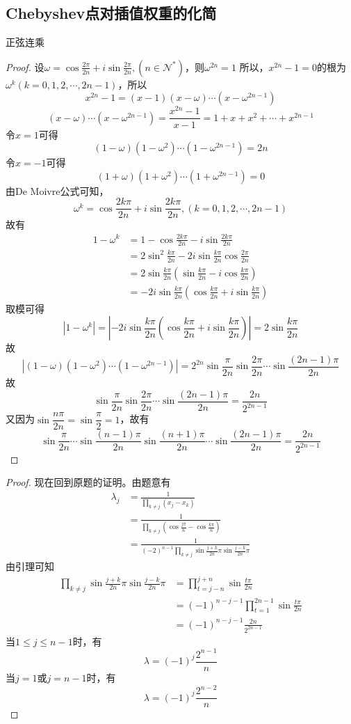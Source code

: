 \documentclass[]{report}
\begin{document}
		\subsection{Chebyshev点对插值权重的化简}
		\begin{lemma}正弦连乘
			\begin{proof}
				设$\displaystyle\omega=\cos\frac{2\pi}{2n}+i\sin\frac{2\pi}{2n},(n\in\mathcal{N}^*)$，则$\omega^{2n}=1$\newline
				所以，$x^{2n}-1=0$的根为$\omega^k(k=0,1,2,\cdots,2n-1)$，所以
				\[x^{2n}-1=(x-1)(x-\omega)\cdots(x-\omega^{2n-1})\]
				\[(x-\omega)\cdots(x-\omega^{2n-1})=\frac{x^{2n}-1}{x-1}=1+x+x^2+\cdots+x^{2n-1}\]
				令$x=1$可得
				\[(1-\omega)(1-\omega^2)\cdots(1-\omega^{2n-1})=2n\]
				令$x=-1$可得
				\[(1+\omega)(1+\omega^2)\cdots(1+\omega^{2n-1})=0\]
				由De Moivre公式可知，
				\[\omega^k=\cos\frac{2k\pi}{2n}+i\sin\frac{2k\pi}{2n},(k=0,1,2,\cdots,2n-1)\]
				故有
				\[\begin{aligned}
					1-\omega^k
					&=1-\cos\frac{2k\pi}{2n}-i\sin\frac{2k\pi}{2n}\\
					&=2\sin^2\frac{k\pi}{2n}-2i\sin\frac{k\pi}{2n}\cos\frac{2\pi}{2n}\\
					&=2\sin\frac{k\pi}{2n}(\sin\frac{k\pi}{2n}-i\cos\frac{k\pi}{2n})\\
					&=-2i\sin\frac{k\pi}{2n}(\cos\frac{k\pi}{2n}+i\sin\frac{k\pi}{2n})
				\end{aligned}\]
				取模可得
				\[|1-\omega^k|=|-2i\sin\frac{k\pi}{2n}(\cos\frac{k\pi}{2n}+i\sin\frac{k\pi}{2n})|=2\sin\frac{k\pi}{2n}\]
				故
				\[|(1-\omega)(1-\omega^2)\cdots(1-\omega^{2n-1})|=2^{2n}\sin\frac{\pi}{2n}\sin\frac{2\pi}{2n}\cdots\sin\frac{(2n-1)\pi}{2n}\]
				故
				\[\sin\frac{\pi}{2n}\sin\frac{2\pi}{2n}\cdots\sin\frac{(2n-1)\pi}{2n}=\frac{2n}{2^{2n-1}}\]
				又因为$\sin\dfrac{n\pi}{2n}=\sin\dfrac{\pi}{2}=1$，故有
				\[\sin\frac{\pi}{2n}\cdots\sin\frac{(n-1)\pi}{2n}\sin\frac{(n+1)\pi}{2n}\cdots\sin\frac{(2n-1)\pi}{2n}=\frac{2n}{2^{2n-1}}\]
			\end{proof}
		\end{lemma}
		\begin{proof}
			现在回到原题的证明。由题意有
			\[\begin{aligned}
				\lambda_j&=\frac{1}{\prod_{k\neq j}(x_j-x_k)}\\
				&=\frac{1}{\prod_{k\neq j}(\cos\frac{j\pi}{n}-\cos\frac{k\pi}{n})}\\
				&=\frac{1}{(-2)^{n-1}\prod_{k\neq j}\sin\frac{j+k}{2n}\pi\sin\frac{j-k}{2n}\pi}
			\end{aligned}\]
			由引理可知
			\[\begin{aligned}
				\prod_{k\neq j}\sin\frac{j+k}{2n}\pi\sin\frac{j-k}{2n}\pi
				&=\prod_{t=j-n}^{j+n}\sin\frac{t\pi}{2n}\\
				&=(-1)^{n-j-1}\prod_{t=1}^{2n-1}\sin\frac{t\pi}{2n}\\
				&=(-1)^{n-j-1}\frac{2n}{2^{2n-1}}
			\end{aligned}\]
			当$1\le j\le n-1$时，有
			\[\lambda=(-1)^j\frac{2^{n-1}}{n}\]
			当$j=1$或$j=n-1$时，有
			\[\lambda=(-1)^j\frac{2^{n-2}}{n}\]

		\end{proof}
\end{document}
